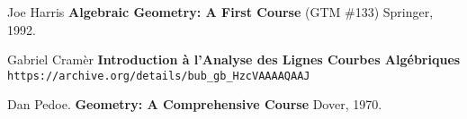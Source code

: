 \documentclass[12pt]{article}
\begin{document}
\vfill

\begin{thebibliography}{}

\item Joe Harris \textbf{Algebraic Geometry: A First Course} (GTM \#133) Springer, 1992.

\item  Gabriel Cram\`{e}r \textbf{Introduction \`{a} l'Analyse des Lignes Courbes Algébriques} \\ \texttt{https://archive.org/details/bub\_{}gb\_{}HzcVAAAAQAAJ}

\item Dan Pedoe.  \textbf{Geometry: A Comprehensive Course} Dover, 1970.

\end{thebibliography}
\end{document}

